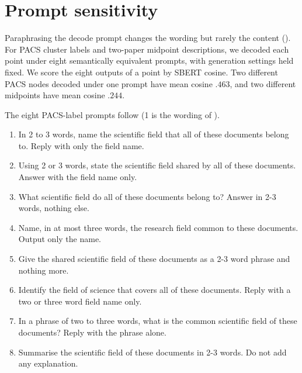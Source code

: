 \section{Prompt sensitivity}
\label{app:prompt-sensitivity}

Paraphrasing the decode prompt changes the wording but rarely the content ().
For PACS cluster labels and two-paper midpoint descriptions, we decoded each point under eight semantically equivalent prompts, with generation settings held fixed.
We score the eight outputs of a point by SBERT cosine.
Two different PACS nodes decoded under one prompt have mean cosine $.463$, and two different midpoints have mean cosine $.244$.

The eight PACS-label prompts follow (1 is the wording of ).
\begin{enumerate}[leftmargin=1.8em,itemsep=2pt,parsep=0pt,topsep=4pt]
\footnotesize
\item In 2 to 3 words, name the scientific field that all of these documents belong to. Reply with only the field name.
\item Using 2 or 3 words, state the scientific field shared by all of these documents. Answer with the field name only.
\item What scientific field do all of these documents belong to? Answer in 2-3 words, nothing else.
\item Name, in at most three words, the research field common to these documents. Output only the name.
\item Give the shared scientific field of these documents as a 2-3 word phrase and nothing more.
\item Identify the field of science that covers all of these documents. Reply with a two or three word field name only.
\item In a phrase of two to three words, what is the common scientific field of these documents? Reply with the phrase alone.
\item Summarise the scientific field of these documents in 2-3 words. Do not add any explanation.
\end{enumerate}

